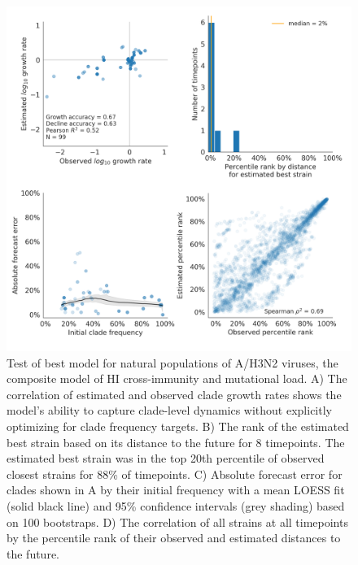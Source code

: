 \begin{figure}[p]
  \begin{center}
  \includegraphics[width=\textwidth]{figures/test-of-best-model-for-natural-populations.png}
  \caption{
  Test of best model for natural populations of A/H3N2 viruses, the composite model of HI cross-immunity and mutational load.
  A) The correlation of estimated and observed clade growth rates shows the model's ability to capture clade-level dynamics without explicitly optimizing for clade frequency targets.
  B) The rank of the estimated best strain based on its distance to the future for 8 timepoints.
  The estimated best strain was in the top 20th percentile of observed closest strains for 88\% of timepoints.
  C) Absolute forecast error for clades shown in A by their initial frequency with a mean LOESS fit (solid black line) and 95\% confidence intervals (grey shading) based on 100 bootstraps.
  D) The correlation of all strains at all timepoints by the percentile rank of their observed and estimated distances to the future.
  }
  \label{fig:test_of_best_model_for_natural_populations}
  \end{center}
\end{figure}

